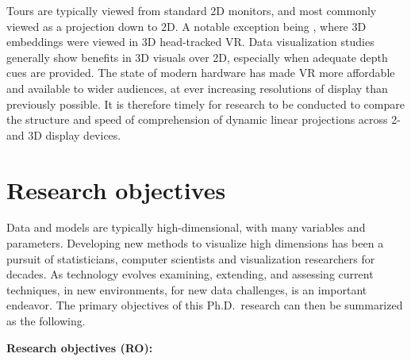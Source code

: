 \documentclass{monashthesis}
\begin{document}
Tours are typically viewed from standard 2D monitors, and most commonly
viewed as a projection down to 2D. A notable exception being
\textcite{nelson_xgobi_1998}, where 3D embeddings were viewed in 3D
head-tracked VR. Data visualization studies generally show benefits in
3D visuals over 2D, especially when adequate depth cues are provided.
The state of modern hardware has made VR more affordable and available
to wider audiences, at ever increasing resolutions of display than
previously possible. It is therefore timely for research to be conducted
to compare the structure and speed of comprehension of dynamic linear
projections across 2- and 3D display devices.

\section{Research objectives}\label{research-objectives}

Data and models are typically high-dimensional, with many variables and
parameters. Developing new methods to visualize high dimensions has been
a pursuit of statisticians, computer scientists and visualization
researchers for decades. As technology evolves examining, extending, and
assessing current techniques, in new environments, for new data
challenges, is an important endeavor. The primary objectives of this
Ph.D.~research can then be summarized as the following.

\textbf{Research objectives (RO):}
\end{document}
